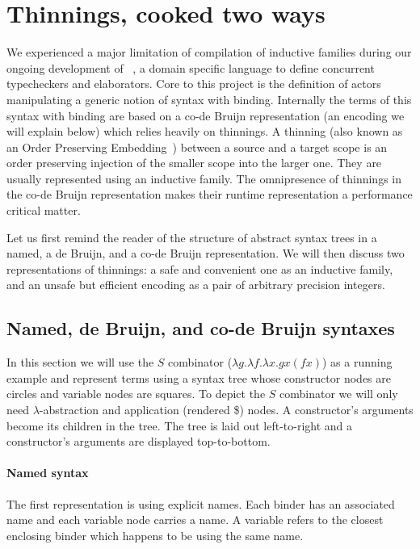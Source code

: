 \section{Thinnings, cooked two ways}\label{sec:codebruijn}

We experienced a major limitation of compilation of inductive families
during our ongoing development of
\typos~\cite{MANUAL:talk/types/Allais22}, a domain specific language
to define concurrent typecheckers and elaborators.
%
Core to this project is the definition of actors manipulating a generic notion
of syntax with binding.
%
Internally the terms of this syntax with binding are based on a co-de Bruijn
representation (an encoding we will explain below) which relies heavily on
thinnings.
%
A thinning (also known as an Order Preserving
Embedding~\cite{MANUAL:phd/nott/Chapman09})
between a source and a target scope is an order preserving injection
of the smaller scope into the larger one.
%
They are usually represented using an inductive family.
%
The omnipresence of thinnings in the co-de Bruijn representation makes their
runtime representation a performance critical matter.

Let us first remind the reader of the structure of abstract syntax trees in a
named, a de Bruijn, and a co-de Bruijn representation. We will then discuss two
representations of thinnings: a safe and convenient one as an inductive family,
and an unsafe but efficient encoding as a pair of arbitrary precision integers.

\subsection{Named, de Bruijn, and co-de Bruijn syntaxes}

In this section we will use
the $S$ combinator ($\lambda g. \lambda f. \lambda x. g x (f x)$)
as a running example and represent
terms using a syntax tree whose constructor nodes are circles and variable nodes
are squares.
%
To depict the $S$ combinator we will only need $\lambda{}$-abstraction and
application (rendered \$) nodes. A constructor's arguments become its children
in the tree.
%
The tree is laid out left-to-right and a constructor's arguments are displayed
top-to-bottom.

\paragraph{Named syntax}
The first representation is using explicit names. Each binder has an associated
name and each variable node carries a name. A variable refers to the closest enclosing
binder which happens to be using the same name.

